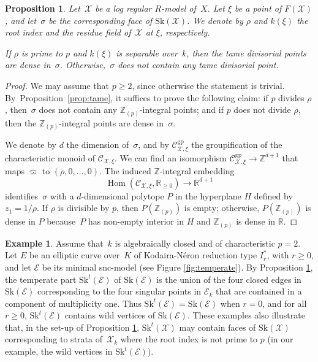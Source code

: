 \documentclass[11pt]{article}
\let\mathcal\mathscr
\newtheorem{prop}[equation]{Proposition}
\theoremstyle{definition}
\newtheorem{example}[equation]{Example}
\numberwithin{equation}{subsection}
\newcommand{\Z}{\ensuremath{\mathbb{Z}}}
\newcommand{\R}{\ensuremath{\mathbb{R}}}
\newcommand{\cX}{\ensuremath{\mathscr{X}}}
\newcommand{\cE}{\ensuremath{\mathscr{E}}}
\newcommand{\gp}{\mathrm{gp}}
\newcommand{\Sk}{\mathrm{Sk}}
\DeclareMathOperator{\Hom}{Hom}
\let\unif\varpi
\begin{document}
\begin{prop}\label{prop:tamecrit}
Let~$\cX$ be a log regular $R$\nobreakdash-model of~$X$. Let $\xi$ be a point of $F(\cX)$, and let~$\sigma$ be the corresponding face of
$\Sk(\cX)$. We denote by $\rho$ and $k(\xi)$ the root index and the residue field of~$\cX$ at $\xi$, respectively.

If $\rho$ is prime to $p$ and $k(\xi)$ is separable over~$k$, then the tame divisorial points are dense in~$\sigma$. Otherwise,~$\sigma$ does not contain any tame divisorial point.
\end{prop}
\begin{proof}
We may assume that $p\geq 2$, since otherwise the statement is trivial.
By~Pro\-position~\ref{prop:tame}, it suffices to prove the following claim: if $p$ divides $\rho$, then~$\sigma$ does not contain any $\Z_{(p)}$-integral points; and if $p$ does not divide $\rho$, then the $\Z_{(p)}$-integral points are dense in~$\sigma$.

We denote by $d$ the dimension of~$\sigma$, and by
$\mathcal{C}^{\gp}_{\cX,\xi}$ the groupification of the characteristic monoid of $\mathcal{C}_{\cX,\xi}$.
We can find an isomorphism $\mathcal{C}^{\gp}_{\cX,\xi}\to \Z^{d+1}$ that maps
$\overline{\unif}$ to $(\rho,0,\ldots,0)$. The induced $\Z$-integral embedding
\[
\Hom(\mathcal{C}_{\cX,\xi}, \R_{\geq 0}) \to \R^{d+1}
\]
identifies~$\sigma$
with a $d$-dimensional polytope $P$ in the hyperplane $H$ defined by $z_1=1/\rho$.
If $\rho$ is divisible by $p$, then $P(\Z_{(p)})$ is empty; otherwise, $P(\Z_{(p)})$ is dense in $P$
because~$P$ has non-empty interior in $H$ and $\Z_{(p)}$ is dense in $\R$.
\end{proof}

\begin{example}\label{exam:temperate}
Assume that~$k$ is algebraically closed and of characteristic $p=2$. Let $E$ be an elliptic curve over~$K$ of Kodaira-Néron reduction type $I^{\ast}_r$, with $r\geq 0$, and let $\mathscr{E}$ be its minimal snc-model (see Figure \ref{fig:temperate}). By Proposition \ref{prop:tamecrit}, the temperate part $\Sk^t(\mathscr{E})$ of $\Sk(\mathscr{E})$ is the union of the four closed edges in $\Sk(\mathscr{E})$ corresponding to the four singular points in $\mathscr{E}_{k}$ that are contained in a component of multiplicity one.
Thus $\Sk^t(\mathscr{E})=\Sk(\mathscr{E})$ when $r=0$, and for all $r\geq 0$,
$\Sk^t(\mathscr{E})$ contains wild vertices of $\Sk(\cE)$. These examples also illustrate that, in the set-up of Proposition \ref{prop:tamecrit},
$\Sk^t(\cX)$ may contain faces of $\Sk(\cX)$ corresponding to strata of~$\cX_k$ where the root index is not prime to $p$ (in our example, the wild vertices in $\Sk^t(\mathscr{E})$).
\end{example}
\end{document}
